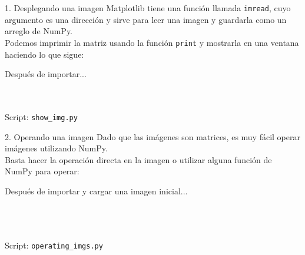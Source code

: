 \documentclass[usenames,dvipsnames]{beamer}
\begin{document}
  \begin{frame}{1. Desplegando una imagen}
    Matplotlib tiene una función llamada \texttt{imread}, cuyo argumento es una
    dirección y sirve para leer una imagen y guardarla como un arreglo de NumPy.\\
    \vspace*{0.3cm}
    Podemos imprimir la matriz usando la función \texttt{print} y mostrarla en
    una ventana haciendo lo que sigue:
    \vspace*{0.3cm}
    \begin{block}{Después de importar...}
      \\
      \\
      \\
      \vspace*{0.5cm}
    \end{block}
    Script: \texttt{show\_img.py}
  \end{frame}

  \begin{frame}{2. Operando una imagen}
    Dado que las imágenes son matrices, es muy fácil operar imágenes utilizando
    NumPy.\\
    \vspace*{0.3cm}
    Basta hacer la operación directa en la imagen o utilizar alguna función de
    NumPy para operar:
    \vspace*{0.3cm}
    \begin{block}{Después de importar y cargar una imagen inicial...}
      \\
      \\
      \\
      \\
      \vspace*{0.5cm}
    \end{block}
    Script: \texttt{operating\_imgs.py}
  \end{frame}
\end{document}
